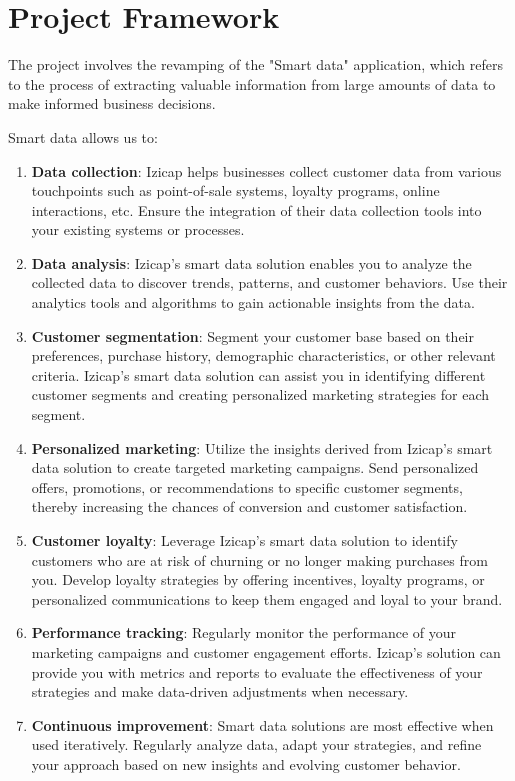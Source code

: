 \section{Project Framework}

The project involves the revamping of the "Smart data" application, which refers to the process of extracting valuable information from large amounts of data to make informed business decisions.

Smart data allows us to:

\begin{enumerate}
\item \textbf{Data collection}: Izicap helps businesses collect customer data from various touchpoints such as point-of-sale systems, loyalty programs, online interactions, etc. Ensure the integration of their data collection tools into your existing systems or processes.
\item \textbf{Data analysis}: Izicap's smart data solution enables you to analyze the collected data to discover trends, patterns, and customer behaviors. Use their analytics tools and algorithms to gain actionable insights from the data.
\item \textbf{Customer segmentation}: Segment your customer base based on their preferences, purchase history, demographic characteristics, or other relevant criteria. Izicap's smart data solution can assist you in identifying different customer segments and creating personalized marketing strategies for each segment.
\item \textbf{Personalized marketing}: Utilize the insights derived from Izicap's smart data solution to create targeted marketing campaigns. Send personalized offers, promotions, or recommendations to specific customer segments, thereby increasing the chances of conversion and customer satisfaction.
\item \textbf{Customer loyalty}: Leverage Izicap's smart data solution to identify customers who are at risk of churning or no longer making purchases from you. Develop loyalty strategies by offering incentives, loyalty programs, or personalized communications to keep them engaged and loyal to your brand.
\item \textbf{Performance tracking}: Regularly monitor the performance of your marketing campaigns and customer engagement efforts. Izicap's solution can provide you with metrics and reports to evaluate the effectiveness of your strategies and make data-driven adjustments when necessary.
\item \textbf{Continuous improvement}: Smart data solutions are most effective when used iteratively. Regularly analyze data, adapt your strategies, and refine your approach based on new insights and evolving customer behavior.
\end{enumerate}

